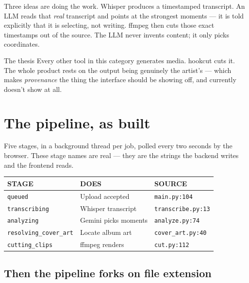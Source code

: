 \documentclass[11pt,a4paper]{article}
\newcommand{\code}[1]{\texttt{\small #1}}
\begin{document}
Three ideas are doing the work. Whisper produces a timestamped transcript. An
LLM reads that \emph{real} transcript and points at the strongest moments --- it
is told explicitly that it is selecting, not writing. ffmpeg then cuts those
exact timestamps out of the source. The LLM never invents content; it only picks
coordinates.

\begin{callout}{The thesis}
Every other tool in this category generates media. hookcut cuts it. The whole
product rests on the output being genuinely the artist's --- which makes
\emph{provenance} the thing the interface should be showing off, and currently
doesn't show at all.
\end{callout}

\section{The pipeline, as built}

Five stages, in a background thread per job, polled every two seconds by the
browser. These stage names are real --- they are the strings the backend writes
and the frontend reads.

\vspace{6pt}
\begin{tabularx}{\linewidth}{@{}l l X@{}}
\toprule
{\sffamily\footnotesize\color{muted}STAGE} &
{\sffamily\footnotesize\color{muted}DOES} &
{\sffamily\footnotesize\color{muted}SOURCE} \\
\midrule
\code{queued}              & Upload accepted          & \code{main.py:104}       \\
\code{transcribing}        & Whisper transcript       & \code{transcribe.py:13}  \\
\code{analyzing}           & Gemini picks moments     & \code{analyze.py:74}     \\
\code{resolving\_cover\_art} & Locate album art       & \code{cover\_art.py:40}  \\
\code{cutting\_clips}      & ffmpeg renders           & \code{cut.py:112}        \\
\bottomrule
\end{tabularx}

\subsection*{Then the pipeline forks on file extension}
\end{document}
